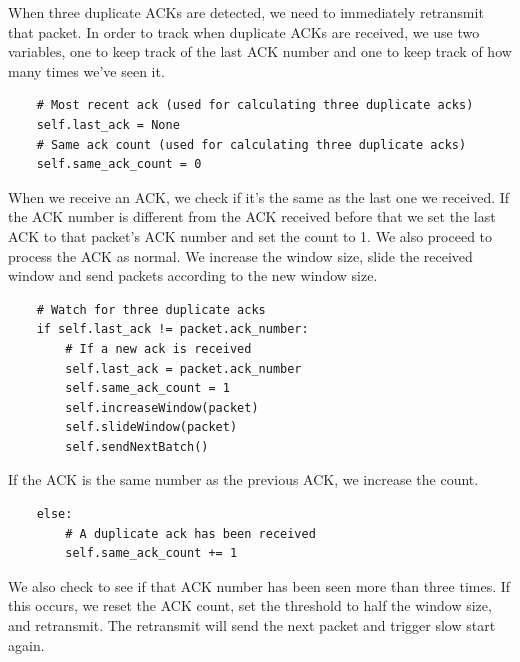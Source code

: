\documentclass[11pt]{article}
\begin{document}
When three duplicate ACKs are detected, we need to immediately retransmit that packet. In order to track when duplicate ACKs are received, we use two variables, one to keep track of the last ACK number and one to keep track of how many times we've seen it.

\vspace{5mm}

\begin{lstlisting}
    # Most recent ack (used for calculating three duplicate acks)
    self.last_ack = None
    # Same ack count (used for calculating three duplicate acks)
    self.same_ack_count = 0
\end{lstlisting}

\vspace{5mm}

When we receive an ACK, we check if it's the same as the last one we received. If the ACK number is different from the ACK received before that we set the last ACK to that packet's ACK number and set the count to 1. We also proceed to process the ACK as normal. We increase the window size, slide the received window and send packets according to the new window size.

\vspace{5mm}

\begin{lstlisting}
    # Watch for three duplicate acks
    if self.last_ack != packet.ack_number:
        # If a new ack is received
        self.last_ack = packet.ack_number
        self.same_ack_count = 1
        self.increaseWindow(packet)
        self.slideWindow(packet)
        self.sendNextBatch()
\end{lstlisting}

\vspace{5mm}

If the ACK is the same number as the previous ACK, we increase the count.

\vspace{5mm}

\begin{lstlisting}
    else:
        # A duplicate ack has been received
        self.same_ack_count += 1
\end{lstlisting}

\vspace{5mm}

We also check to see if that ACK number has been seen more than three times. If this occurs, we reset the ACK count, set the threshold to half the window size, and retransmit. The retransmit will send the next packet and trigger slow start again.
\end{document}
